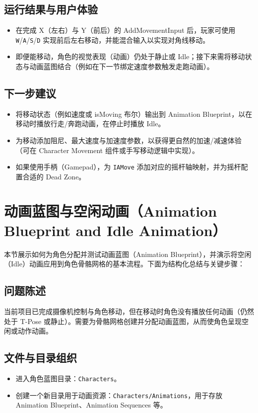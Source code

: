 \documentclass[10pt,CJKmath]{zhbook-v1}
\newcommand{\il}[1]{\texttt{#1}}%
\begin{document}
\subsection{运行结果与用户体验}
\begin{itemize}
  \item 在完成 X（左右）与 Y（前后）的 AddMovementInput 后，玩家可使用 \il{W}/\il{A}/\il{S}/\il{D} 实现前后左右移动，并能混合输入以实现对角线移动。
  \item 即便能移动，角色的视觉表现（动画）仍处于静止或 Idle；接下来需将移动状态与动画蓝图结合（例如在下一节绑定速度参数触发走跑动画）。
\end{itemize}

\subsection{下一步建议}
\begin{itemize}
  \item 将移动状态（例如速度或 isMoving 布尔）输出到 Animation Blueprint，以在移动时播放行走/奔跑动画，在停止时播放 Idle。
  \item 为移动添加阻尼、最大速度与加速度参数，以获得更自然的加速/减速体验（可在 Character Movement 组件或手写移动逻辑中实现）。
  \item 如果使用手柄（Gamepad），为 \il{IAMove} 添加对应的摇杆轴映射，并为摇杆配置合适的 Dead Zone。
\end{itemize}



\section{动画蓝图与空闲动画（Animation Blueprint and Idle Animation）}

本节展示如何为角色分配并测试动画蓝图（Animation Blueprint），并演示将空闲（Idle）动画应用到角色骨骼网格的基本流程。下面为结构化总结与关键步骤：

\subsection{问题陈述}
当前项目已完成摄像机控制与角色移动，但在移动时角色没有播放任何动画（仍然处于 T-Pose 或静止）。需要为骨骼网格创建并分配动画蓝图，从而使角色呈现空闲或动作动画。

\subsection{文件与目录组织}
\begin{itemize}
  \item 进入角色蓝图目录：\il{Characters}。
  \item 创建一个新目录用于动画资源：\il{Characters/Animations}，用于存放 Animation Blueprint、Animation Sequences 等。
\end{itemize}
\end{document}
